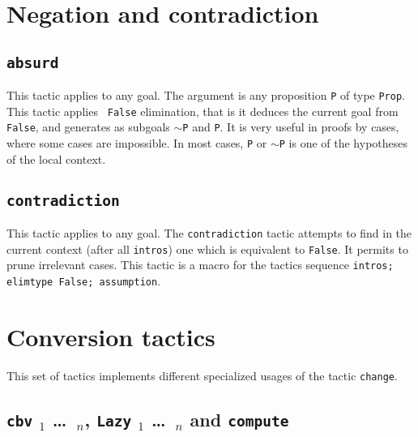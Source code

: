 \section{Negation and contradiction}

\subsection{\tt absurd \term}
\label{absurd}

This tactic applies to any goal. The argument {\term} is any
proposition {\tt P} of type {\tt Prop}. This tactic applies {\tt
  False} elimination, that is it deduces the current goal from {\tt
  False}, and generates as subgoals {\tt $\sim$P} and {\tt P}. It is
very useful in proofs by cases, where some cases are impossible. In
most cases, \texttt{P} or $\sim$\texttt{P} is one of the hypotheses of
the local context.

\subsection{\tt contradiction}
\label{contradiction}

This tactic applies to any goal. The {\tt contradiction} tactic
attempts to find in the current context (after all {\tt intros}) one
which is equivalent to {\tt False}. It permits to prune irrelevant
cases.  This tactic is a macro for the tactics sequence {\tt intros;
  elimtype False; assumption}.

\begin{ErrMsgs}
\item {}
\end{ErrMsgs}


\section{Conversion tactics}
\label{Conversion-tactics}

This set of tactics implements different specialized usages of the
tactic \texttt{change}.


\subsection{{\tt cbv} \flag$_1$ \dots\ \flag$_n$, {\tt Lazy} \flag$_1$
\dots\ \flag$_n$ {\rm and} {\tt compute}}

